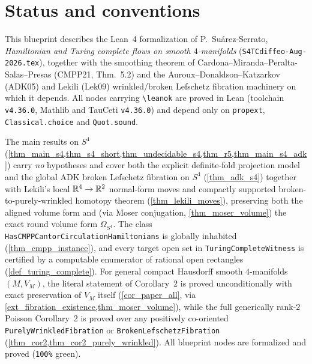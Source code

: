 %

\chapter{Status and conventions}
\label{chap_status}

This blueprint describes the Lean~4 formalization of P.~Su\'arez-Serrato, \emph{Hamiltonian and
Turing complete flows on smooth $4$-manifolds} (\texttt{S4TCdiffeo-Aug-2026.tex}), together with
the smoothing theorem of Cardona--Miranda--Peralta-Salas--Presas (CMPP21, Thm.~5.2) and the
Auroux--Donaldson--Katzarkov (ADK05) and Lekili (Lek09) wrinkled/broken Lefschetz fibration
machinery on which it depends. All nodes carrying \texttt{\textbackslash leanok} are proved in
Lean (toolchain \texttt{v4.36.0}, Mathlib and TauCeti \texttt{v4.36.0}) and depend only on
\texttt{propext}, \texttt{Classical.choice} and \texttt{Quot.sound}.

The main results on $S^4$ (\cref{thm_main_s4,thm_s4_short,thm_undecidable_s4,thm_r5,thm_main_s4_adk})
carry \emph{no} hypotheses and cover both the explicit definite-fold projection model and the
global ADK broken Lefschetz fibration on $S^4$ (\cref{thm_adk_s4}) together with Lekili's local
$\mathbb{R}^4\to\mathbb{R}^2$ normal-form moves and compactly supported broken-to-purely-wrinkled homotopy theorem
(\cref{thm_lekili_moves}), preserving both the aligned volume form and (via Moser conjugation,
\cref{thm_moser_volume}) the exact round volume form $\Omega_{S^4}$. The class
\texttt{HasCMPPCantorCirculationHamiltonians} is globally inhabited (\cref{thm_cmpp_instance}), and
every target open set in \texttt{TuringCompleteWitness} is certified by a computable enumerator of
rational open rectangles (\cref{def_turing_complete}). For general compact Hausdorff smooth
$4$-manifolds $(M,V_M)$, the literal statement of Corollary~2 is proved unconditionally with exact
preservation of $V_M$ itself (\cref{cor_paper_all}, via \cref{ext_fibration_existence,thm_moser_volume}),
while the full generically rank-$2$ Poisson Corollary~2 is proved over any positively co-oriented
\texttt{PurelyWrinkledFibration} or \texttt{BrokenLefschetzFibration}
(\cref{thm_cor2,thm_cor2_purely_wrinkled}). All blueprint nodes are formalized and proved (\texttt{100\%} green).

